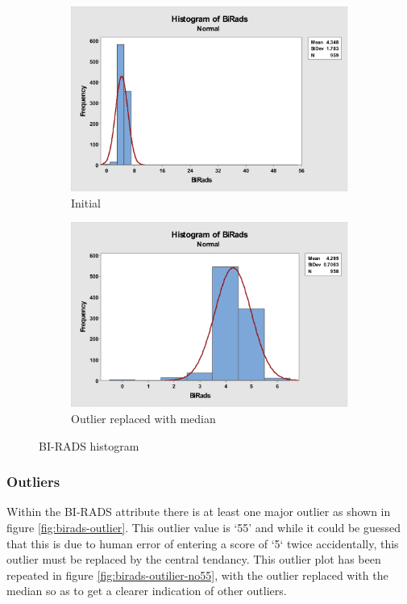 \documentclass[12pt]{article}
\begin{document}
        \begin{figure}[H]
          \begin{subfigure}[b]{0.45\textwidth}
            \includegraphics[width=\textwidth]{birads-histogram}
            \caption{Initial}
            \label{fig:birads-histogram}
          \end{subfigure}
          \hfill
          \begin{subfigure}[b]{0.45\textwidth}
            \includegraphics[width=\textwidth]{birads-histogram-no55}
            \caption{Outlier replaced with median}
            \label{fig:birads-histogram-no55}
          \end{subfigure}
          \caption{BI-RADS histogram}
          \label{fig:birads-both-histogram}
        \end{figure}

      \subsubsection{Outliers} \label{birad-outlier}
        Within the BI-RADS attribute there is at least one major outlier as shown in figure \ref{fig:birads-outlier}. This outlier value is ‘55’ and while it could be guessed that this is due to human error of entering a score of ‘5‘ twice accidentally, this outlier must be replaced by the central tendancy. This outlier plot has been repeated in figure \ref{fig:birads-outilier-no55}, with the outlier replaced with the median so as to get a clearer indication of other outliers.
\end{document}
